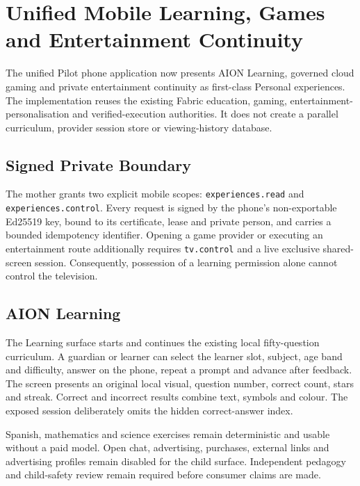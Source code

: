 \begingroup
\sloppy
\section{Unified Mobile Learning, Games and Entertainment Continuity}
\label{sec:pilot-unified-mobile-experiences}

The unified Pilot phone application now presents AION Learning, governed cloud gaming and
private entertainment continuity as first-class Personal experiences.  The implementation reuses
the existing Fabric education, gaming, entertainment-personalisation and verified-execution
authorities.  It does not create a parallel curriculum, provider session store or viewing-history
database.

\subsection{Signed Private Boundary}

The mother grants two explicit mobile scopes: \texttt{experiences.read} and
\texttt{experiences.control}.  Every request is signed by the phone's non-exportable Ed25519 key,
bound to its certificate, lease and private person, and carries a bounded idempotency identifier.
Opening a game provider or executing an entertainment route additionally requires
\texttt{tv.control} and a live exclusive shared-screen session.  Consequently, possession of a
learning permission alone cannot control the television.

\subsection{AION Learning}

The Learning surface starts and continues the existing local fifty-question curriculum.  A
guardian or learner can select the learner slot, subject, age band and difficulty, answer on the
phone, repeat a prompt and advance after feedback.  The screen presents an original local visual,
question number, correct count, stars and streak.  Correct and incorrect results combine text,
symbols and colour.  The exposed session deliberately omits the hidden correct-answer index.

Spanish, mathematics and science exercises remain deterministic and usable without a paid model.
Open chat, advertising, purchases, external links and advertising profiles remain disabled for
the child surface.  Independent pedagogy and child-safety review remain required before consumer
claims are made.

